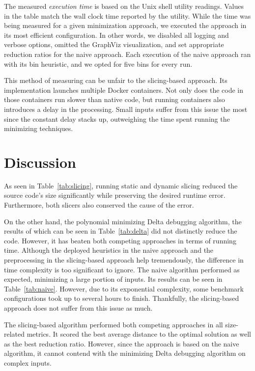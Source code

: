 The measured \emph{execution time} is based on the  Unix shell 
utility readings. 
Values in the table match the wall clock time reported by the utility. 
While the time was being measured for a given minimization approach, we 
executed the approach in its most efficient configuration. 
In other words, we disabled all logging and verbose options, omitted 
the GraphViz visualization, and set appropriate reduction ratios for 
the naive approach. 
Each execution of the naive approach ran with its bin heuristic, and we 
opted for five bins for every run. 

This method of measuring can be unfair to the slicing-based approach. 
Its implementation launches multiple Docker containers. 
Not only does the code in those containers run slower than native code, 
but running containers also introduces a delay in the processing. 
Small inputs suffer from this issue the most since the constant delay stacks 
up, outweighing the time spent running the minimizing techniques.

\section{Discussion}
As seen in Table~\ref{tab:slicing}, running static and dynamic slicing 
reduced the source code's size significantly while preserving the desired 
runtime error. 
Furthermore, both slicers also conserved the cause of the error.

On the other hand, the polynomial minimizing Delta debugging algorithm, 
the results of which can be seen in Table~\ref{tab:delta} did not distinctly 
reduce the code. 
However, it has beaten both competing approaches in terms of running time. 
Although the deployed heuristics in the naive approach and the preprocessing 
in the slicing-based approach help tremendously, the difference in time 
complexity is too significant to ignore.
The naive algorithm performed as expected, minimizing a large portion of 
inputs. Its results can be seen in Table~\ref{tab:naive}. 
However, due to its exponential complexity, some benchmark configurations 
took up to several hours to finish. 
Thankfully, the slicing-based approach does not suffer from this issue as 
much.

The slicing-based algorithm performed both competing approaches in all 
size-related metrics. 
It scored the best average distance to the optimal solution as well as 
the best reduction ratio. 
However, since the approach is based on the naive algorithm, it cannot 
contend with the minimizing Delta debugging algorithm on complex inputs.

